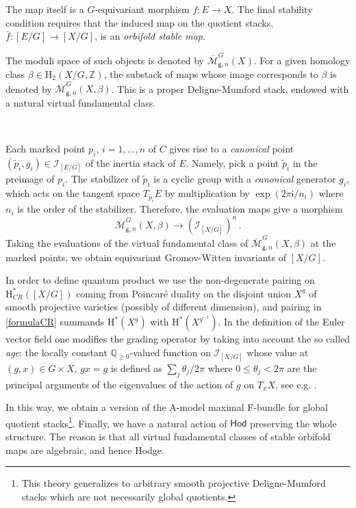 \documentclass[12pt,a4paper]{amsart}
\theoremstyle{definition}
\theoremstyle{remark}
\newcommand{\rH}{\mathrm{H}}
\begin{document}
The map itself is a $G$-equivariant morphism $f: E \to X$. The final stability condition requires that the induced map on the quotient stacks, $\bar{f}: [E/G] \to [X/G]$, is an \emph{orbifold stable map}. 

The moduli space of such objects is denoted by $\overline{\mathcal{M}}_{\mathsf g,n}^{G}(X)$. For a given homology class $\beta \in \rH_2(X/G, \mathbb{Z})$, the substack of maps whose image corresponds to $\beta$ is denoted by $\overline{\mathcal{M}}_{\mathsf g,n}^{G}(X, \beta)$. This is a proper Deligne-Mumford stack, endowed with a natural virtual fundamental class.

\ 

Each marked point $p_i,\,i=1,\dots,n$ of $C$ gives rise to a \textit{canonical} point $(\tilde p_i,g_i)\in \mathcal I_{[E/G]}$ of the inertia stack of $E$. Namely, pick a point $\tilde p_i$ in the preimage of $p_i$. The stabilizer of $\tilde p_i$ is a cyclic group with a \textit{canonical} generator $g_i$, which acts on the tangent space $T_{\tilde p_i}E$ by multiplication by $\exp(2\pi\mathsf i/n_i)$ where $n_i$ is the order of the stabilizer. Therefore, the evaluation maps give a morphism
$$\overline{\mathcal{M}}_{\mathsf g,n}^{G}(X, \beta)\to (\mathcal I_{[X/G]})^{n}\,.$$
Taking the evaluations of the virtual fundamental class of $\overline{\mathcal{M}}_{\mathsf g,n}^{G}(X, \beta)$ at the marked points, we obtain equivariant Gromov-Witten invariants of $[X/G]$.




In order to define quantum product we use the non-degenerate pairing on $\mathrm{H}^\ast_{CR}([X/G])$ coming from Poincar\'{e} duality on the disjoint union $X^g$ of smooth projective varieties (possibly of different dimension), and pairing in \eqref{formulaCR} summands $\rH^\ast(X^g)$ with $\rH^\ast(X^{g^{-1}})$. In the definition of the  Euler vector field one modifies the grading operator by taking into account the so called \textit{age}: the locally constant $\mathbb Q_{\ge 0}$-valued function on $\mathcal I_{[X/G]}$ whose value at $(g,x)\in G\times X,\,gx=g$ is defined as  $\sum_j \theta_j/2\pi$ where $0\le \theta_j<2\pi$ are the principal arguments of the eigenvalues of the action of $g$ on $T_x X$, see e.g. \cite{Jarvis2005}.


In this way, we obtain a version of the A-model maximal F-bundle for global quotient stacks\footnote{This theory generalizes to arbitrary smooth projective Deligne-Mumford stacks which are not necessarily global quotients.}.
Finally, we have a natural action of $\mathsf{Hod}$ preserving the whole structure. The reason is that all virtual fundamental classes of stable orbifold maps are algebraic, and hence Hodge.
\end{document}
